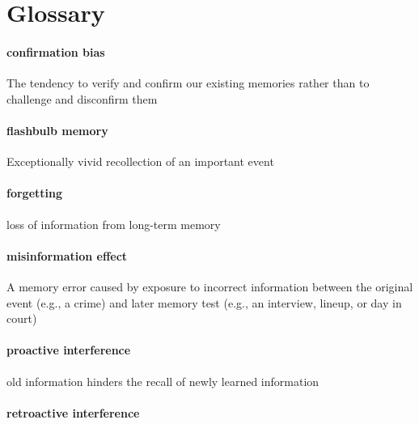 \documentclass[
]{krantz}
\begin{document}
\section{Glossary}\label{glossary-5}

\paragraph*{confirmation bias}\label{confirmation-bias}

The tendency to verify and confirm our existing memories rather than to challenge and disconfirm them

\paragraph*{flashbulb memory}\label{flashbulb-memory}

Exceptionally vivid recollection of an important event

\paragraph*{forgetting}\label{forgetting-1}

loss of information from long-term memory

\paragraph*{misinformation effect}\label{misinformation-effect-1}

A memory error caused by exposure to incorrect information between the original event (e.g., a crime) and later memory test (e.g., an interview, lineup, or day in court)

\paragraph*{proactive interference}\label{proactive-interference}

old information hinders the recall of newly learned information

\paragraph*{retroactive interference}\label{retroactive-interference}
\end{document}
